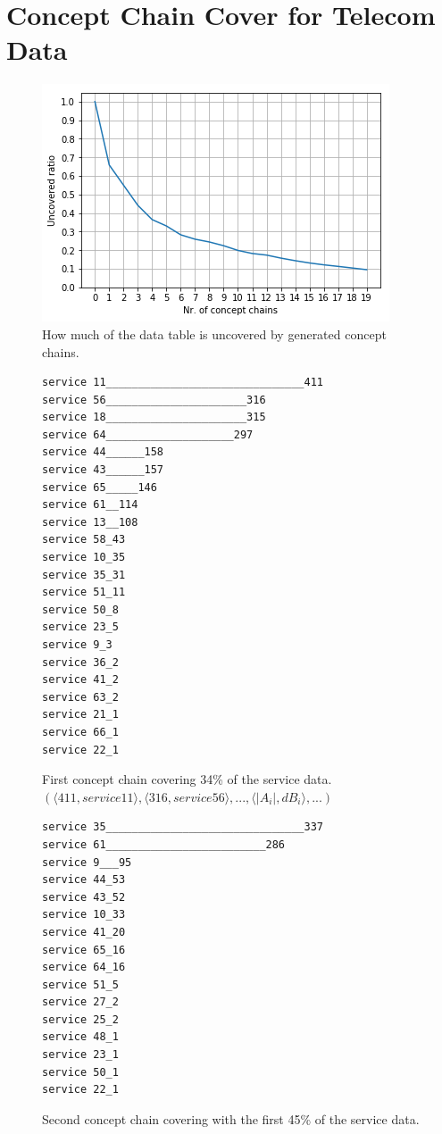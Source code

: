 \documentclass[acmconf,authordraft]{acmart}
\begin{document}
\section{Concept Chain Cover for Telecom Data}

\begin{figure}[ht]
  \centering
  \includegraphics[width=\linewidth]{telia_ccc}
  \caption{How much of the data table is uncovered by generated concept chains.}
\end{figure}


\begin{figure}[!htb]
\vspace{.5cm}
\begin{verbatim}
service 11_______________________________411
service 56______________________316
service 18______________________315
service 64____________________297
service 44______158
service 43______157
service 65_____146
service 61__114
service 13__108
service 58_43
service 10_35
service 35_31
service 51_11
service 50_8
service 23_5
service 9_3
service 36_2
service 41_2
service 63_2
service 21_1
service 66_1
service 22_1
\end{verbatim}

\caption{First concept chain covering 34\% of the service data. $(\langle 411, service 11 \rangle,\langle 316, service 56 \rangle,  ..., \langle |A_i|, dB_i \rangle, ...)$}
\label{fig:ccc_1}
\end{figure}


\begin{figure}[!htb]
\vspace{.5cm}
\begin{verbatim}
service 35_______________________________337
service 61_________________________286
service 9___95
service 44_53
service 43_52
service 10_33
service 41_20
service 65_16
service 64_16
service 51_5
service 27_2
service 25_2
service 48_1
service 23_1
service 50_1
service 22_1
\end{verbatim}

\caption{Second concept chain covering with the first 45\% of the service data.}
\label{fig:ccc_2}
\end{figure}
\end{document}
